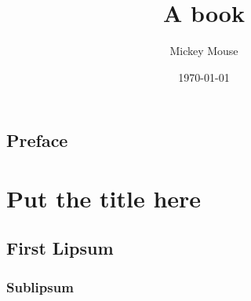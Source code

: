 \author{Mickey Mouse}
\title{A book}
\date{\today}


  \maketitle

  \frontmatter
  \chapter{Preface}

  \mainmatter
  \part{Put the title here}
    \chapter{First Lipsum}
      \section{Sublipsum}
        \lipsum[1-19]
